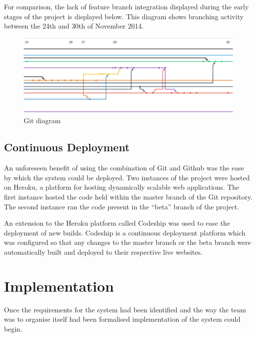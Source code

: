 \documentclass[a4paper]{l3proj}
\begin{document}
 For comparison, the lack of feature branch integration displayed during the early stages of the project is displayed below. This diagram shows branching activity between the 24th and 30th of November 2014. 

\begin{figure}[ht]
\centering
\includegraphics[scale=0.5]{diagram2}
\caption{Git diagram}
\end{figure} 

\section{Continuous Deployment}
\label{deployment}

An unforeseen benefit of using the combination of Git and Github was the ease by which the system could be deployed. Two instances of the project were hosted on Heroku, a platform for hosting dynamically scalable web applications. The first instance hosted the code held within the master branch of the Git repository. The second instance ran the code present in the “beta” branch of the project.

An extension to the Heroku platform called Codeship was used to ease the deployment of new builds. Codeship is a continuous deployment platform which was configured so that any changes to the master branch or the beta branch were automatically built and deployed to their respective live websites.


\chapter{Implementation}
\label{impl}

Once the requirements for the system had been identified and the way the team was to organise itself had been formalised implementation of the system could begin.


\end{document}
